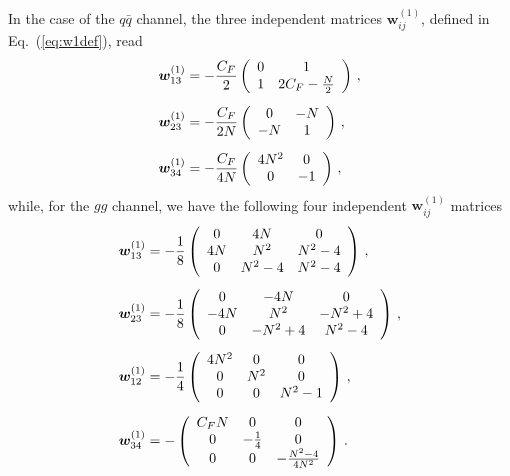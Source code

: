 \documentclass[a4paper,11pt]{article}
\newcommand{\qqbar}{{\ensuremath{q \bar q}}\xspace}
\newcommand{\bfw}{\bm{w}}
\numberwithin{equation}{section}
\begin{document}
In the case of the \qqbar channel, the three independent matrices
$\bfw_{ij}^{(1)}$, defined in Eq.~(\ref{eq:w1def}), read
%
\begin{subequations}
  \allowdisplaybreaks
  \begin{align}
  \bfw_{13}^{(1)} & = 
  - \frac{C_F}{2}
  \left( \begin{array}{cc}
    0 & 1 \\
    1 & 2 C_F -\frac{N}{2}
  \end{array} \right)\,,
  \\[0.5em]
  \bfw_{23}^{(1)} & = 
  - \frac{C_F}{2N}
  \left( \begin{array}{cc}
    0 & -N \\
    -N & 1 
  \end{array} \right)\,,
  \\[0.5em]
  \bfw_{34}^{(1)} & = 
  - \frac{C_F}{4N}
  \left( \begin{array}{cc}
    4N^2 & 0 \\
    0 & -1 
  \end{array} \right)\,,
  \end{align}
\end{subequations}
%
while, for the $gg$ channel, we have the following four independent
$\bfw_{ij}^{(1)}$ matrices
%
\begin{subequations}
  \allowdisplaybreaks
  \begin{align}
   \bfw_{13}^{(1)} & = 
   -\frac{1}{8}
   \left( \begin{array}{ccc}
     0  & 4N     & 0 \\
     4N & N^2    & N^2-4 \\
     0  & N^2-4  & N^2-4
   \end{array} \right)\,,
   \\[0.5em]
   \bfw_{23}^{(1)} & = 
   -\frac{1}{8}
   \left( \begin{array}{ccc}
     0   & -4N     & 0 \\
     -4N & N^2     & -N^2+4 \\
     0   & -N^2+4  & N^2-4
   \end{array} \right)\,,
   \\[0.5em]
   \bfw_{12}^{(1)} & = 
   - \frac{1}{4}
   \left( \begin{array}{ccc}
     4N^2 & 0   & 0 \\
     0    & N^2 & 0 \\
     0    & 0   & N^2-1
   \end{array} \right)\,,
   \\[0.5em]
   \bfw_{34}^{(1)} & = 
   - 
   \left( \begin{array}{ccc}
     C_F N & 0            & 0 \\
     0     & -\frac{1}{4} & 0 \\
     0     & 0            & -\frac{N^2-4}{4N^2}
   \end{array} \right)\,.
  \end{align}
\end{subequations}
\end{document}
